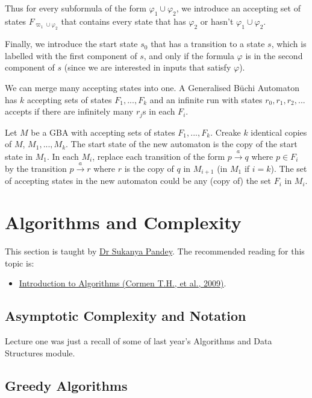 Thus for every subformula of the form \(\varphi_1 \cup \varphi_2\), we introduce an accepting set of states \(F_{\varpi_1 \cup \varphi_2}\) that contains every state that has \(\varphi_2\) or hasn't \(\varphi_1 \cup \varphi_2\).

Finally, we introduce the start state \(s_0\) that has a transition to a state \(s\), which is labelled with the first component of \(s\), and only if the formula \(\varphi\) is in the second component of \(s\) (since we are interested in inputs that satisfy \(\varphi\)).

We can merge many accepting states into one.
A Generalised B{\"u}chi Automaton has \(k\) accepting sets of states \(F_1,...,F_k\) and an infinite run with states \(r_0,r_1,r_2,...\) accepts if there are infinitely many \(r_j\)s in each \(F_i\).

{Let \(M\) be a GBA with accepting sets of states \(F_1,...,F_k\).
Creake \(k\) identical copies of \(M\), \(M_1,...,M_k\).
The start state of the new automaton is the copy of the start state in \(M_1\).
In each \(M_i\), replace each transition of the form \(p \xrightarrow{a} q\) where \(p \in F_i\) by the transition \(p \xrightarrow{a} r\) where \(r\) is the copy of \(q\) in \(M_{i+1}\) (in \(M_1\) if \(i=k\)).
The set of accepting states in the new automaton could be any (copy of) the set \(F_i\) in \(M_i\).}

\section{Algorithms and Complexity}

This section is taught by \hyperref[lecturer-toc-sukanyapandey]{Dr Sukanya Pandey}. The recommended reading for this topic is: 
\begin{itemize}
    \item \hyperref[cit:Introduction to Algorithms]{Introduction to Algorithms (Cormen T.H., et al., 2009)}.
\end{itemize}

\subsection{Asymptotic Complexity and Notation}

Lecture one was just a recall of some of last year's Algorithms and Data Structures module.

\subsection{Greedy Algorithms}

